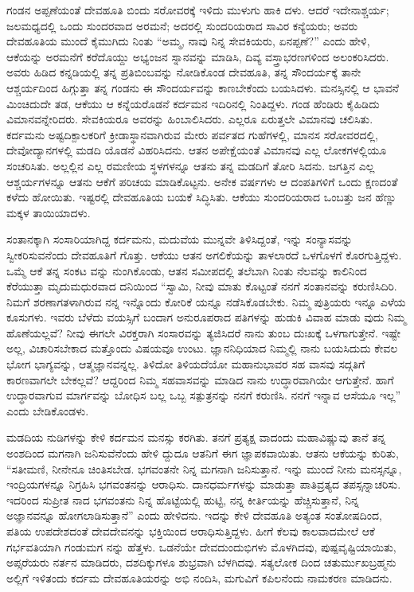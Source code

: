 ಗಂಡನ ಅಪ್ಪಣೆಯಂತೆ ದೇವಹೂತಿ ಬಿಂದು ಸರೋವರಕ್ಕೆ ಇಳಿದು ಮುಳುಗು ಹಾಕಿ ದಳು. ಆದರೆ ಇದೇನಾಶ್ಚರ್ಯ; ಜಲಮಧ್ಯದಲ್ಲಿ ಒಂದು ಸುಂದರವಾದ ಅರಮನೆ; ಅದರಲ್ಲಿ ಸುಂದರಿಯರಾದ ಸಾವಿರ ಕನ್ಯೆಯರು; ಅವರು ದೇವಹೂತಿಯ ಮುಂದೆ ಕೈಮುಗಿದು ನಿಂತು “ಅಮ್ಮ, ನಾವು ನಿನ್ನ ಸೇವಕಿಯರು, ಏನಪ್ಪಣೆ?” ಎಂದು ಹೇಳಿ, ಆಕೆಯನ್ನು ಅರಮನೆಗೆ ಕರೆದೊಯ್ದು ಅಭ್ಯಂಜನ ಸ್ನಾನವನ್ನು ಮಾಡಿಸಿ, ದಿವ್ಯ ವಸ್ತ್ರಾಭರಣಗಳಿಂದ ಅಲಂಕರಿಸಿದರು. ಅವರು ಹಿಡಿದ ಕನ್ನಡಿಯಲ್ಲಿ ತನ್ನ ಪ್ರತಿಬಿಂಬವನ್ನು ನೋಡಿಕೊಂಡ ದೇವಹೂತಿ, ತನ್ನ ಸೌಂದರ್ಯಕ್ಕೆ ತಾನೇ ಆಶ್ಚರ್ಯದಿಂದ ಹಿಗ್ಗುತ್ತಾ ತನ್ನ ಗಂಡನು ಈ ಸೌಂದರ್ಯವನ್ನು ಕಾಣಬೇಕೆಂದು ಬಯಸಿದಳು. ಮನಸ್ಸಿನಲ್ಲಿ ಆ ಭಾವನೆ ಮಿಂಚಿದುದೇ ತಡ, ಆಕೆಯು ಆ ಕನ್ನೆಯರೊಡನೆ ಕರ್ದಮನ ಇದಿರಿನಲ್ಲಿ ನಿಂತಿದ್ದಳು. ಗಂಡ ಹೆಂಡಿರು ಕೈಹಿಡಿದು ವಿಮಾನವನ್ನೇರಿದರು. ಸೇವಕಿಯರೂ ಅವರನ್ನು ಹಿಂಬಾಲಿಸಿದರು. ಎಲ್ಲರೂ ಏರುತ್ತಲೇ ವಿಮಾನವು ಚಲಿಸಿತು. ಕರ್ದಮನು ಅಷ್ಟದಿಕ್ಪಾಲಕರಿಗೆ ಕ್ರೀಡಾಸ್ಥಾನವಾಗಿರುವ ಮೇರು ಪರ್ವತದ ಗುಹೆಗಳಲ್ಲಿ, ಮಾನಸ ಸರೋವರದಲ್ಲಿ, ದೇವೋದ್ಯಾನಗಳಲ್ಲಿ ಮಡದಿ ಯೊಡನೆ ವಿಹರಿಸಿದನು. ಆತನ ಅಪೇಕ್ಷೆಯಂತೆ ವಿಮಾನವು ಎಲ್ಲ ಲೋಕಗಳಲ್ಲಿಯೂ ಸಂಚರಿಸಿತು. ಅಲ್ಲಲ್ಲಿನ ಎಲ್ಲ ರಮಣೀಯ ಸ್ಥಳಗಳನ್ನೂ ಆತನು ತನ್ನ ಮಡದಿಗೆ ತೋರಿ ಸಿದನು. ಜಗತ್ತಿನ ಎಲ್ಲ ಆಶ್ಚರ್ಯಗಳನ್ನೂ ಆತನು ಆಕೆಗೆ ಪರಿಚಯ ಮಾಡಿಕೊಟ್ಟನು. ಅನೇಕ ವರ್ಷಗಳು ಆ ದಂಪತಿಗಳಿಗೆ ಒಂದು ಕ್ಷಣದಂತೆ ಕಳೆದು ಹೋಯಿತು. ಇಷ್ಟರಲ್ಲಿ ದೇವಹೂತಿಯ ಬಯಕೆ ಸಿದ್ಧಿಸಿತು. ಆಕೆಯು ಸುಂದರಿಯರಾದ ಒಂಬತ್ತು ಜನ ಹೆಣ್ಣು ಮಕ್ಕಳ ತಾಯಿಯಾದಳು.

ಸಂತಾನಕ್ಕಾಗಿ ಸಂಸಾರಿಯಾಗಿದ್ದ ಕರ್ದಮನು, ಮದುವೆಯ ಮುನ್ನವೇ ತಿಳಿಸಿದ್ದಂತೆ, ಇನ್ನು ಸಂನ್ಯಾಸವನ್ನು ಸ್ವೀಕರಿಸುವನೆಂದು ದೇವಹೂತಿಗೆ ಗೊತ್ತು. ಆಕೆಯು ಆತನ ಅಗಲಿಕೆಯನ್ನು ತಾಳಲಾರದೆ ಒಳಗೊಳಗೆ ಕೊರಗುತ್ತಿದ್ದಳು. ಒಮ್ಮೆ ಆಕೆ ತನ್ನ ಸಂಕಟ ವನ್ನು ನುಂಗಿಕೊಂಡು, ಆತನ ಸಮೀಪದಲ್ಲಿ ತಲೆಬಾಗಿ ನಿಂತು ನೆಲವನ್ನು ಕಾಲಿನಿಂದ ಕೆರೆಯುತ್ತಾ ಮೃದುಮಧುರವಾದ ದನಿಯಿಂದ “ಸ್ವಾಮಿ, ನೀವು ಮಾತು ಕೊಟ್ಟಂತೆ ನನಗೆ ಸಂತಾನವನ್ನು ಕರುಣಿಸಿದಿರಿ. ನಿಮಗೆ ಶರಣಾಗತಳಾಗಿರುವ ನನ್ನ ಇನ್ನೊಂದು ಕೋರಿಕೆ ಯನ್ನೂ ನಡೆಸಿಕೊಡಬೇಕು. ನಿಮ್ಮ ಪುತ್ರಿಯರು ಇನ್ನೂ ಎಳೆಯ ಕೂಸುಗಳು. ಇವರು ಬೆಳೆದು ವಯಸ್ಸಿಗೆ ಬಂದಾಗ ಅನುರೂಪರಾದ ಪತಿಗಳನ್ನು ಹುಡುಕಿ ವಿವಾಹ ಮಾಡು ವುದು ನಿಮ್ಮ ಹೊಣೆಯಲ್ಲವೆ? ನೀವು ಈಗಲೇ ವಿರಕ್ತರಾಗಿ ಸಂಸಾರವನ್ನು ತ್ಯಜಿಸಿದರೆ ನಾನು ತುಂಬ ದುಃಖಕ್ಕೆ ಒಳಗಾಗುತ್ತೇನೆ. ಇಷ್ಟೇ ಅಲ್ಲ, ವಿಚಾರಿಸಬೇಕಾದ ಮತ್ತೊಂದು ವಿಷಯವೂ ಉಂಟು. ಜ್ಞಾನನಿಧಿಯಾದ ನಿಮ್ಮಲ್ಲಿ ನಾನು ಬಯಸಿದುದು ಕೇವಲ ಭೋಗ ಭಾಗ್ಯವನ್ನು, ಆತ್ಮಜ್ಞಾನವನ್ನಲ್ಲ. ತಿಳಿದೋ ತಿಳಿಯದೆಯೋ ಮಹಾನುಭಾವರ ಸಹ ವಾಸವು ಸದ್ಗತಿಗೆ ಕಾರಣವಾಗಲೇ ಬೇಕಲ್ಲವೆ? ಆದ್ದರಿಂದ ನಿಮ್ಮ ಸಹವಾಸವನ್ನು ಮಾಡಿದ ನಾನು ಉದ್ಧಾರವಾಗಿಯೇ ಆಗುತ್ತೇನೆ. ಹಾಗೆ ಉದ್ಧಾರವಾಗುವ ಮಾರ್ಗವನ್ನು ಬೋಧಿಸ ಬಲ್ಲ ಒಬ್ಬ ಸತ್ಪುತ್ರನನ್ನು ನನಗೆ ಕರುಣಿಸಿ. ನನಗೆ ಇನ್ನಾವ ಆಸೆಯೂ ಇಲ್ಲ” ಎಂದು ಬೇಡಿಕೊಂಡಳು.

ಮಡದಿಯ ನುಡಿಗಳನ್ನು ಕೇಳಿ ಕರ್ದಮನ ಮನಸ್ಸು ಕರಗಿತು. ತನಗೆ ಪ್ರತ್ಯಕ್ಷ ವಾದಂದು ಮಹಾವಿಷ್ಣುವು ತಾನೆ ತನ್ನ ಅಂಶದಿಂದ ಮಗನಾಗಿ ಜನಿಸುವೆನೆಂದು ಹೇಳಿ ದ್ದುದೂ ಆತನಿಗೆ ಈಗ ಜ್ಞಾಪಕವಾಯಿತು. ಆತನು ಆಕೆಯನ್ನು ಕುರಿತು, “ಸತೀಮಣಿ, ನೀನೇನೂ ಚಿಂತಿಸಬೇಡ. ಭಗವಂತನೇ ನಿನ್ನ ಮಗನಾಗಿ ಜನಿಸುತ್ತಾನೆ. ಇನ್ನು ಮುಂದೆ ನೀನು ಮನಸ್ಸನ್ನೂ, ಇಂದ್ರಿಯಗಳನ್ನೂ ನಿಗ್ರಹಿಸಿ ಭಗವಂತನನ್ನು ಆರಾಧಿಸು. ದಾನಧರ್ಮಗಳನ್ನು ಮಾಡುತ್ತಾ ಪಾತಿವ್ರತ್ಯದ ತಪಸ್ಸನ್ನಾಚರಿಸು. ಇದರಿಂದ ಸುಪ್ರೀತ ನಾದ ಭಗವಂತನು ನಿನ್ನ ಹೊಟ್ಟೆಯಲ್ಲಿ ಹುಟ್ಟಿ, ನನ್ನ ಕೀರ್ತಿಯನ್ನು ಹೆಚ್ಚಿಸುತ್ತಾನೆ, ನಿನ್ನ ಅಜ್ಞಾನವನ್ನೂ ಹೋಗಲಾಡಿಸುತ್ತಾನೆ” ಎಂದು ಹೇಳಿದನು. ಇದನ್ನು ಕೇಳಿ ದೇವಹೂತಿ ಅತ್ಯಂತ ಸಂತೋಷದಿಂದ, ಪತಿಯ ಉಪದೇಶದಂತೆ ದೇವದೇವನನ್ನು ಭಕ್ತಿಯಿಂದ ಆರಾಧಿಸುತ್ತಿದ್ದಳು. ಹೀಗೆ ಕೆಲವು ಕಾಲವಾದಮೇಲೆ ಆಕೆ ಗರ್ಭವತಿಯಾಗಿ ಗಂಡುಮಗ ನನ್ನು ಹೆತ್ತಳು. ಒಡನೆಯೇ ದೇವದುಂದುಭಿಗಳು ಮೊಳಗಿದವು, ಪುಷ್ಪವೃಷ್ಟಿಯಾಯಿತು, ಅಪ್ಸರೆಯರು ನರ್ತನ ಮಾಡಿದರು, ದಶದಿಕ್ಕುಗಳೂ ಶುಭ್ರವಾಗಿ ಬೆಳಗಿದವು. ಸತ್ಯಲೋಕ ದಿಂದ ಚತುರ್ಮುಖಬ್ರಹ್ಮನು ಅಲ್ಲಿಗೆ ಇಳಿತಂದು ಕರ್ದಮ ದೇವಹೂತಿಯರನ್ನು ಅಭಿ ನಂದಿಸಿ, ಮಗುವಿಗೆ ಕಪಿಲನೆಂದು ನಾಮಕರಣ ಮಾಡಿದನು.

